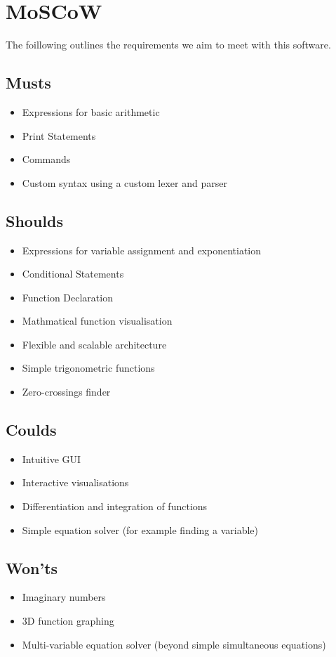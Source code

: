 \documentclass[a4paper, oneside, 11pt]{report}
\begin{document}
\section{MoSCoW}
The foillowing outlines the requirements we aim to meet with this software.

\subsection{Musts}

\begin{itemize}
	\item Expressions for basic arithmetic
	\item Print Statements
	\item Commands
	\item Custom syntax using a custom lexer and parser
\end{itemize}

\subsection{Shoulds}

\begin{itemize}
	\item Expressions for variable assignment and exponentiation
	\item Conditional Statements
	\item Function Declaration
	\item Mathmatical function visualisation
	\item Flexible and scalable architecture
	\item Simple trigonometric functions
	\item Zero-crossings finder
\end{itemize}

\subsection{Coulds}
\begin{itemize}
	\item Intuitive GUI
	\item Interactive visualisations
	\item Differentiation and integration of functions
	\item Simple equation solver (for example finding a variable)
\end{itemize}

\subsection{Won'ts}
\begin{itemize}
	\item Imaginary numbers
	\item 3D function graphing
	\item Multi-variable equation solver (beyond simple simultaneous equations)
\end{itemize}
\end{document}
